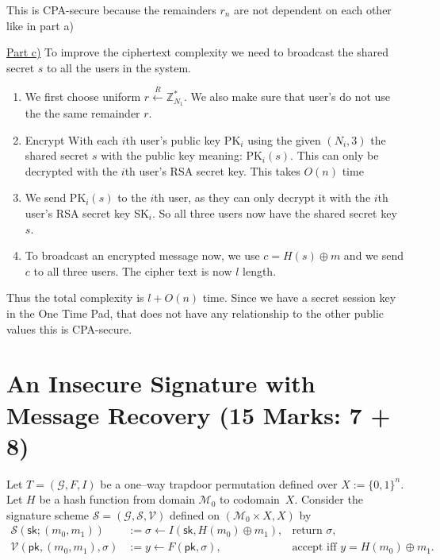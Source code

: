 \documentclass[12pt]{article}
\newcommand{\Z}{\mathbb{Z}}
\newcommand{\xor}{\oplus}
\begin{document}
This is CPA-secure because the remainders $r_n$ are not dependent on each other like in part a) 

\underline{Part c)}
To improve the ciphertext complexity we need to broadcast the shared secret $s$ to all the 
users in the system. 
\begin{enumerate}
    \item We first choose uniform $r \stackrel{R}{\leftarrow} \Z^{\ast}_{N_1}$. 
We also make sure that user's do not use the the same  remainder $r$.
    \item Encrypt With each $i$th user's public key PK$_i$ using the given $(N_i, 3)$ the
shared secret $s$ with the public key meaning: PK$_i(s)$. This can only be decrypted with the $i$th user's 
RSA secret key. This takes $O(n)$ time
    \item We send PK$_i(s)$ to the $i$th user, as they can only decrypt it with the $i$th user's 
RSA secret key SK$_i$. So all three users now have the shared secret key $s$.
    \item To broadcast an encrypted message now, we use $c = H(s) \xor m$ and we send $c$ to all three
users. The cipher text is now $l$ length.
\end{enumerate} 

Thus the total complexity is $l + O(n)$ time. Since we have a secret session key in the One Time Pad,
that does not have any relationship to the other public values this is CPA-secure.



\section{An Insecure Signature with Message Recovery \hfill (15 Marks: 7 + 8)}

Let $T = (\mathcal{G},F,I)$ be a one–way trapdoor permutation defined over $X := \{0,1\}^n$.  Let $H$ be a hash function from domain $\mathcal{M}_0$ to codomain~$X$.  Consider the signature scheme $\mathcal{S} = (\mathcal{G},\mathcal{S},\mathcal{V})$ defined on $(\mathcal{M}_0 \times X, X)$ by
\begin{align*}
    \mathcal{S}(\mathsf{sk}; (m_0,m_1)) &:= \sigma \leftarrow I(\mathsf{sk}, H(m_0) \xor m_1), & \text{return } \sigma,\\
    \mathcal{V}(\mathsf{pk}, (m_0,m_1), \sigma) &:= y \leftarrow F(\mathsf{pk}, \sigma), & \text{accept iff } y = H(m_0) \xor m_1.
\end{align*}
\end{document}

